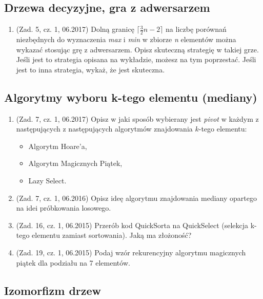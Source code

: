 \documentclass[10pt]{article}%
\begin{document}
\subsection*{Drzewa decyzyjne, gra z adwersarzem}

\begin{enumerate}

\item (Zad. 5, cz. 1, 06.2017) Dolną granicę $\lceil \frac{3}{2} n - 2 \rceil $ na liczbę porównań niezbędnych do wyznaczenia \emph{max} i \emph{min} w zbiorze \emph{n} elementów można wykazać stosując grę z adwersarzem. Opisz skuteczną strategię w takiej grze. Jeśli jest to strategia opisana na wykładzie, możesz na tym poprzestać. Jeśli jest to inna strategia, wykaż, że jest skuteczna.

\end{enumerate}


\subsection*{Algorytmy wyboru k-tego elementu (mediany)}

\begin{enumerate}

\item (Zad. 7, cz. 1, 06.2017) Opisz w jaki sposób wybierany jest \emph{pivot} w każdym z następujących z następujących algorytmów znajdowania $k$-tego elementu: 
\begin{itemize}
	\item Algorytm Hoare'a,
	\item Algorytm Magicznych Piątek,
	\item Lazy Select.
\end{itemize}

\item (Zad. 7, cz. 1, 06.2016) Opisz ideę algorytmu znajdowania mediany opartego na idei próbkowania losowego.

\item (Zad. 16, cz. 1, 06.2015) Przerób kod QuickSorta na QuickSelect (selekcja k-tego elementu zamiast sortowania). Jaką ma złożoność?

\item (Zad. 19, cz. 1, 06.2015) Podaj wzór rekurencyjny algorytmu magicznych piątek dla podziału na 7 elementów. 

\end{enumerate}


\subsection*{Izomorfizm drzew}
\end{document}
